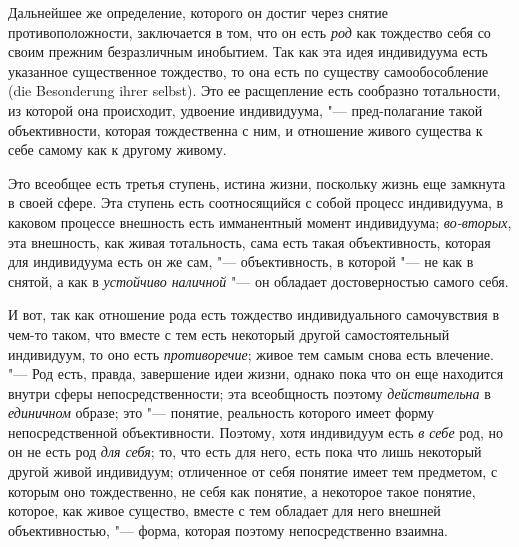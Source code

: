 {{Дальнейшее же определение, которого он достиг через снятие
противоположности, заключается в том, что он есть
{\em род} как тождество
себя со своим прежним безразличным инобытием. Так как эта
идея индивидуума есть указанное существенное тождество, то она есть по
существу самообособление (die Besonderung ihrer selbst). Это
ее расщепление есть сообразно тотальности, из которой она происходит,
удвоение индивидуума, "--- пред-полагание такой объективности,
которая тождественна с ним, и отношение живого существа к себе самому как к
другому живому.

Это всеобщее есть третья ступень, истина жизни, поскольку
жизнь еще замкнута в своей сфере. Эта ступень есть соотносящийся с собой
процесс индивидуума, в каковом процессе внешность есть имманентный момент
индивидуума; {\em во-вторых},
эта внешность, как живая тотальность, сама есть такая
объективность, которая для индивидуума есть он же сам, "---
объективность, в которой "--- не как в снятой, а
как в {\em устойчиво наличной}
"--- он обладает достоверностью самого себя.

И вот, так как отношение рода есть тождество индивидуального
самочувствия в чем-то таком, что вместе с тем есть некоторый другой
самостоятельный индивидуум, то оно есть
{\em противоречие}; живое
тем самым снова есть влечение. "--- Род есть, правда,
завершение идеи жизни, однако пока что он еще находится внутри сферы
непосредственности; эта всеобщность поэтому
{\em действительна} в
{\em единичном} образе;
это "--- понятие, реальность которого имеет форму
непосредственной объективности. Поэтому, хотя индивидуум есть
{\em в себе} род, но он
не есть род {\em для себя};
то, что есть для него, есть пока что лишь некоторый другой
живой индивидуум; отличенное от себя понятие имеет тем предметом, с которым
оно тождественно, не себя как понятие, а некоторое такое понятие, которое,
как живое существо, вместе с тем обладает для него внешней объективностью,
"--- форма, которая поэтому непосредственно взаимна.

}}
